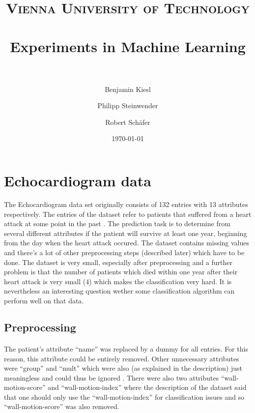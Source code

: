 \documentclass[paper=a4, fontsize=11pt]{scrartcl} %
\title{ 
\normalfont \normalsize 
\textsc{Vienna University of Technology} \\ [25pt] %
\horrule{0.5pt} \\[0.4cm] %
\huge Experiments in Machine Learning \\ %
\horrule{2pt} \\[0.5cm] %
}
\author{Benjamin Kiesl \and Philipp Steinwender \and Robert Sch\"{a}fer} %
\date{\normalsize\today} %
\numberwithin{equation}{section} %
\numberwithin{figure}{section} %
\numberwithin{table}{section} %
\begin{document}
\maketitle %




\section{Echocardiogram data}

The Echocardiogram data set originally consists of 132 entries with 13 attributes respectively. The entries of the dataset refer to patients that suffered from a heart attack at some point in the past \cite{uci-repo}. The prediction task is to determine from several different attributes if the patient will survive at least one year, beginning from the day when the heart attack occured. The dataset contains missing values and there's a lot of other preprocessing steps (described later) which have to be done. The dataset is very small, especially after preprocessing and a further problem is that the number of patients which died within one year after their heart attack is very small (4) which makes the classification very hard. It is nevertheless an interesting question wether some classification algorithm can perform well on that data.

\subsection{Preprocessing}
\paragraph{}The patient's attribute ``name'' was replaced by a dummy for all entries. For this reason, this attribute could be entirely removed. Other unnecessary attributes were ``group'' and ``mult'' which were also (as explained in the description) just meaningless and could thus be ignored \cite{uci-repo}. There were also two attributes ``wall-motion-score'' and ``wall-motion-index'' where the description of the dataset said that one should only use the ``wall-motion-index'' for classification issues and so ``wall-motion-score'' was also removed.
\end{document}
